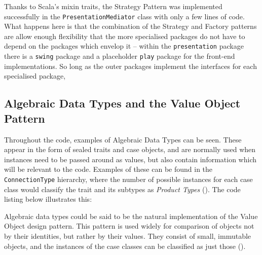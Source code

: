 Thanks to Scala's mixin traits, the Strategy Pattern was implemented
successfully in the \texttt{PresentationMediator} class with only a few lines
of code. What happens here is that the combination of the Strategy and Factory
patterns are allow enough flexibility that the more specialised packages do not
have to depend on the packages which envelop it -- within the
\texttt{presentation} package there is a \texttt{swing} package and a
placeholder \texttt{play} package for the front-end implementations. So long as
the outer packages implement the interfaces for each specialised package, 

\subsection{Algebraic Data Types and the Value Object Pattern} \label{sec:Implementation.ADTAndValueObject}

Throughout the code, examples of Algebraic Data Types can be seen. These appear
in the form of sealed traits and case objects, and are normally used when
instances need to be passed around as values, but also contain information
which will be relevant to the code. Examples of these can be found in the
\texttt{ConnectionType} hierarchy, where the number of possible instances for
each case class would classify the trait and its subtypes as \emph{Product
Types} (\cite[][p.~411]{wampler2015programming}). The code listing below
illustrates this:

{
  \small
  
}

Algebraic data types could be said to be the natural implementation of the
Value Object design pattern. This pattern is used widely for comparison of
objects not by their identities, but rather by their values. They consist of
small, immutable objects, and the instances of the case classes can be
classified as just those (\cite[][Ch.~8,~Location~3068]{nikolov2016scala}).

